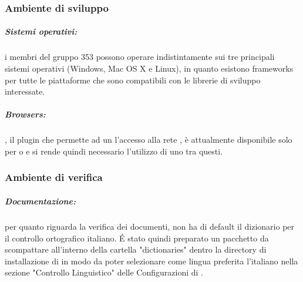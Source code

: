 	\subsubsection{Ambiente di sviluppo}
	\subparagraph{Sistemi operativi:} i membri del gruppo 353 possono operare indistintamente sui tre principali sistemi operativi (Windows, Mac OS X e Linux), in quanto esistono frameworks per tutte le piattaforme che sono compatibili con le librerie di sviluppo interessate.
	\subparagraph{Browsers:} , il plugin che permette ad un  l'accesso alla rete , è attualmente disponibile solo per  o  e si rende quindi necessario l'utilizzo di uno tra questi.
	\subsubsection{Ambiente di verifica}
	\subparagraph{Documentazione:} per quanto riguarda la verifica dei documenti,  non
		ha di default il dizionario per il controllo ortografico italiano. \'{E}
		stato quindi preparato un pacchetto da scompattare all'interno della cartella
		"dictionaries" dentro la directory di installazione di  in modo da
		poter selezionare come lingua preferita l'italiano nella sezione "Controllo
		Linguistico" delle Configurazioni di .
